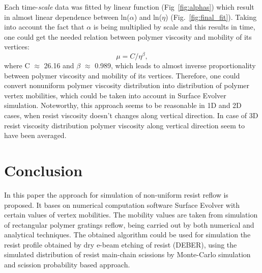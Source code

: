 \documentclass[12pt]{iopart}
\begin{document}
Each time-\textit{scale} data was fitted by linear function (Fig~\ref{fig:alphas}) which result in almost linear dependence between ln(\textit{$\alpha$}) and ln($\eta$) (Fig.~\ref{fig:final_fit}). Taking into account the fact that $\alpha$ is being multiplied by scale and this results in time, one could get the needed relation between polymer viscosity and mobility of its vertices:
\begin{equation}
	\mu = C / \eta^\beta,
\end{equation}
where C $\approx$ 26.16 and $\beta$ $\approx$ 0.989, which leads to almost inverse proportionality between polymer viscosity and mobility of its vertices. Therefore, one could convert nonuniform polymer viscosity distribution into distribution of polymer vertex mobilities, which could be taken into account in Surface Evolver simulation. Noteworthy, this approach seems to be reasonable in 1D and 2D cases, when resist viscosity doesn't changes along vertical direction. In case of 3D resist viscosity distribution polymer viscosity along vertical direction seem to have been averaged.


\section{Conclusion}
In this paper the approach for simulation of non-uniform resist reflow is proposed. It bases on numerical computation software Surface Evolver with certain values of vertex mobilities. The mobility values are taken from simulation of rectangular polymer gratings reflow, being carried out by both numerical and analytical techniques. The obtained algorithm could be used for simulation the resist profile obtained by dry e-beam etching of resist (DEBER), using the simulated distribution of resist main-chain scissions by Monte-Carlo simulation and scission probability based approach.

\printbibliography
\end{document}
